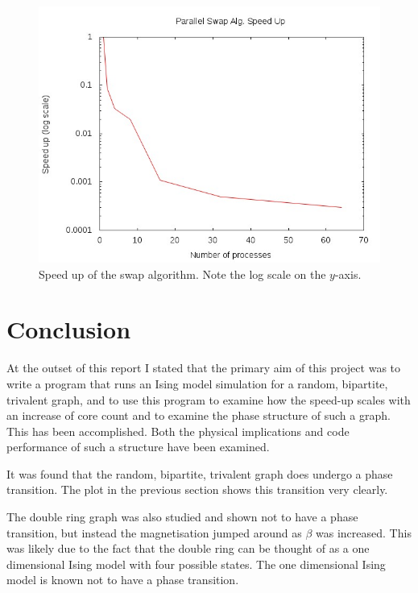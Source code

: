 \documentclass[pdftex,12pt,a4paper]{article}
\begin{document}
\begin{figure}
\centering
\includegraphics[scale=0.8]{swap_speed.jpg}
\caption{Speed up of the swap algorithm. Note the log scale on the $y$-axis.}
\end{figure}






\newpage

\section{Conclusion}

At the outset of this report I stated that the primary aim of this project was to write a program that runs an Ising model simulation for a random, bipartite, trivalent graph, and to use this program to examine how the speed-up scales with an increase of core count and to examine the phase structure of such a graph. This has been accomplished. Both the physical implications and code performance of such a structure have been examined.

It was found that the random, bipartite, trivalent graph does undergo a phase transition. The plot in the previous section shows this transition very clearly.

The double ring graph was also studied and shown not to have a phase transition, but instead the magnetisation jumped around as $\beta$ was increased. This was likely due to the fact that the double ring can be thought of as a one dimensional Ising model with four possible states. The one dimensional Ising model is known not to have a phase transition.
\end{document}
